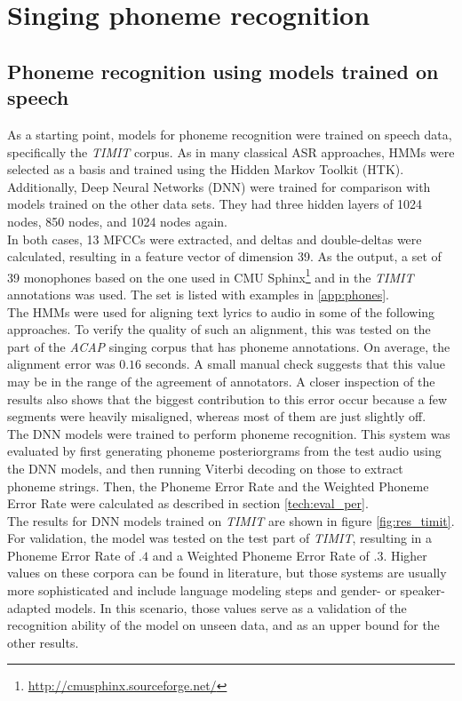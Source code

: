 \chapter{Singing phoneme recognition} \label{chap:phonerec}
\section{Phoneme recognition using models trained on speech} \label{sec:phonerec_timit}
As a starting point, models for phoneme recognition were trained on speech data, specifically the \textit{TIMIT} corpus. As in many classical ASR approaches, HMMs were selected as a basis and trained using the Hidden Markov Toolkit (HTK)\cite{htk}.\\
Additionally, Deep Neural Networks (DNN) were trained for comparison with models trained on the other data sets. They had three hidden layers of 1024 nodes, 850 nodes, and 1024 nodes again.\\
In both cases, 13 MFCCs were extracted, and deltas and double-deltas were calculated, resulting in a feature vector of dimension 39. As the output, a set of 39 monophones based on the one used in CMU Sphinx\footnote{\url{http://cmusphinx.sourceforge.net/}} and in the \textit{TIMIT} annotations was used. The set is listed with examples in \ref{app:phones}.\\
The HMMs were used for aligning text lyrics to audio in some of the following approaches. To verify the quality of such an alignment, this was tested on the part of the \textit{ACAP} singing corpus that has phoneme annotations. On average, the alignment error was $0.16$ seconds. A small manual check suggests that this value may be in the range of the agreement of annotators. A closer inspection of the results also shows that the biggest contribution to this error occur because a few segments were heavily misaligned, whereas most of them are just slightly off.\\
The DNN models were trained to perform phoneme recognition. This system was evaluated by first generating phoneme posteriorgrams from the test audio using the DNN models, and then running Viterbi decoding on those to extract phoneme strings. Then, the Phoneme Error Rate and the Weighted Phoneme Error Rate were calculated as described in section \ref{tech:eval_per}.\\
The results for DNN models trained on \textit{TIMIT} are shown in figure \ref{fig:res_timit}. For validation, the model was tested on the test part of \textit{TIMIT}, resulting in a Phoneme Error Rate of $.4$ and a Weighted Phoneme Error Rate of $.3$. Higher values on these corpora can be found in literature, but those systems are usually more sophisticated and include language modeling steps and gender- or speaker-adapted models. In this scenario, those values serve as a validation of the recognition ability of the model on unseen data, and as an upper bound for the other results.\\
